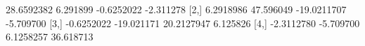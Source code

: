 \begin{Schunk}
\begin{Soutput}
           [,1]       [,2]        [,3]      [,4]
[1,] 28.6592382   6.291899  -0.6252022 -2.311278
[2,]  6.2918986  47.596049 -19.0211707 -5.709700
[3,] -0.6252022 -19.021171  20.2127947  6.125826
[4,] -2.3112780  -5.709700   6.1258257 36.618713
\end{Soutput}
\end{Schunk}
